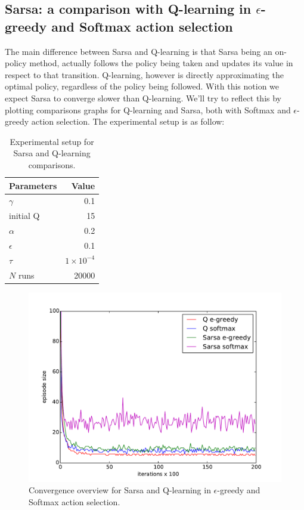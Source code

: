 \documentclass[paper=a4, fontsize=11pt]{scrartcl}
\numberwithin{equation}{section}		%
\numberwithin{figure}{section}			%
\numberwithin{table}{section}				%
\begin{document}
\subsection{Sarsa: a comparison with Q-learning in $\epsilon$-greedy and Softmax action selection}
The main difference between Sarsa and Q-learning is that Sarsa being an on-policy method, actually follows the policy being taken and updates its value in respect to that transition. Q-learning, however is directly approximating the optimal policy, regardless of the policy being followed. With this notion we expect Sarsa to converge slower than Q-learning. We'll try to reflect this by plotting comparisons graphs for Q-learning and Sarsa, both with Softmax and $\epsilon$-greedy action selection. The experimental setup is as follow:
\begin{table}[H]
\caption{Experimental setup for Sarsa and Q-learning comparisons.}
\centering
\begin{tabular}{|l|r|}
\hline
Parameters & Value \\\hline
$\gamma$ & 0.1 \\\hline
initial Q & 15 \\\hline
$\alpha$ & 0.2\\\hline
$\epsilon$ & 0.1\\\hline
$\tau$ & $1 \times 10^{-4}$\\\hline
$N$ runs & 20000\\\hline
\end{tabular}
\label{expSetupSarsa}
\end{table}
\begin{figure}[H] \centering
\includegraphics[scale=0.5]{sarsaOverview.pdf}
\caption{Convergence overview for Sarsa and Q-learning in $\epsilon$-greedy and Softmax action selection.} 
\label{figure:sarsaOverview}
\end{figure}
\end{document}
